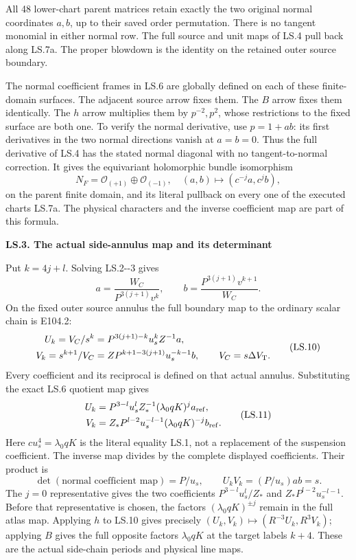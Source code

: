 All 48 lower-chart parent matrices retain exactly the
two original normal coordinates \(a,b\), up to their
saved order permutation. There is no tangent monomial
in either normal row. The full source and unit maps of
LS.4 pull back along LS.7a. The proper blowdown is the
identity on the retained outer source boundary.

The normal coefficient frames in LS.6 are globally defined on
each of these finite-domain surfaces. The adjacent source arrow
fixes them. The \(B\) arrow fixes them identically. The \(h\)
arrow multiplies them by \(p^{-2},p^2\), whose restrictions to
the fixed surface are both one. To verify the normal derivative,
use \(p=1+ab\): its first derivatives in the two normal directions
vanish at \(a=b=0\). Thus the full derivative of LS.4 has the
stated normal diagonal with no tangent-to-normal correction.
It gives the equivariant holomorphic bundle isomorphism
\[
 N_F=\mathcal O_{(+1)}\oplus\mathcal O_{(-1)},
 \quad (a,b)\longmapsto(c^{-j}a,c^jb),
 \tag{LS.8}
\]
on the parent finite domain, and its literal pullback on
every one of the executed charts LS.7a. The physical
characters and the inverse coefficient map are part of
this formula.

\par

\medskip\noindent\textbf{LS.3. The actual side-annulus map and its determinant}

\par\nobreak

Put \(k=4j+l\). Solving LS.2-\/-3 gives
\[
 a=\frac{W_C}{P^{3(j+1)}v^k},\qquad
 b=\frac{P^{3(j+1)}v^{k+1}}{W_C}.
 \tag{LS.9}
\]
On the fixed outer source annulus the full boundary map to the
ordinary scalar chain is E104.2:
\[
\begin{aligned}
 U_k=V_C/s^k
 &=P^{3(j+1)-k}u_s^kZ^{-1}a,\\
 V_k=s^{k+1}/V_C
 &=ZP^{k+1-3(j+1)}u_s^{-k-1}b,
 \qquad V_C=s\Delta V_{\rm T}.
\end{aligned}
\tag{LS.10}
\]
Every coefficient and its reciprocal is defined on that actual
annulus. Substituting the exact LS.6 quotient map gives
\[
\begin{aligned}
 U_k&=P^{3-l}u_s^l Z_*^{-1}
       (\lambda _0qK)^j a_{\rm ref},\\
 V_k&=Z_*P^{l-2}u_s^{-l-1}
       (\lambda _0qK)^{-j}b_{\rm ref}.
\end{aligned}
\tag{LS.11}
\]
Here \(cu_s^4=\lambda _0qK\) is the literal equality LS.1,
not a replacement of the suspension coefficient. The inverse
map divides by the complete displayed coefficients. Their
product is
\[
 \det(\text{normal coefficient map})=P/u_s,
 \qquad U_kV_k=(P/u_s)ab=s.
 \tag{LS.12}
\]
The \(j=0\) representative gives the two coefficients
\(P^{3-l}u_s^l/Z_*\) and
\(Z_*P^{l-2}u_s^{-l-1}\). Before that representative is
chosen, the factors \((\lambda _0qK)^{\pm j}\) remain in
the full atlas map. Applying \(h\) to LS.10 gives precisely
\((U_k,V_k)\mapsto(R^{-3}U_k,R^3V_k)\); applying \(B\)
gives the full opposite factors \(\lambda _0qK\) at the
target labels \(k+4\). These are the actual side-chain
periods and physical line maps.

